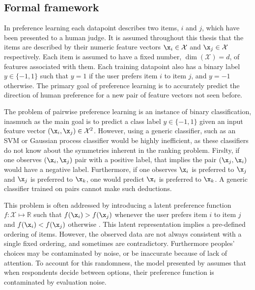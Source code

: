 
\subsection{Formal framework\label{sec:prefKernel}}

In preference learning each datapoint describes two items, $i$ and $j$, which have been presented to a human judge. It is assumed throughout this thesis that the items are described by their numeric feature vectors $\x_i\in\mathcal{X}$ and $\x_j\in\mathcal{X}$ respectively. Each item is assumed to have a fixed number, $\dim(\mathcal{X})=d$, of features associated with them. Each training datapoint also has a binary label $y\in\{-1,1\}$ such that $y=1$ if the user prefers item $i$ to item $j$, and $y=-1$ otherwise. The primary goal of preference learning is to accurately predict the direction of human preference for a new pair of feature vectors not seen before.

The problem of pairwise preference learning is an instance of binary classification, inasmuch as the main goal is to predict a class label $y\in\{-1,1\}$ given an input feature vector $(\x_i,\x_j)\in\mathcal{X}^2$. However, using a generic classifier, such as an SVM or Gaussian process classifier would be highly inefficient, as these classifiers do not know about the symmetries inherent in the ranking problem. Firslty, if one observes $(\x_i,\x_j)$ pair with a positive label, that implies the pair $(\x_j,\x_i)$ would have a negative label. Furthermore, if one observes $\x_i$ is preferred to $\x_j$ and $\x_j$ is preferred to $\x_k$, one would predict $\x_i$ is preferred to $\x_k$. A generic classifier trained on pairs cannot make such deductions.

This problem is often addressed by introducing a latent preference function $f:\mathcal{X}\mapsto \mathbb{R}$ such that
$f(\x_i) > f(\x_j)$ whenever the user prefers item $i$ to item $j$ and $f(\x_i) < f(\x_j)$ otherwise \citep{chu2005}. This latent representation implies a pre-defined ordering of items. However, the observed data are not always consistent with a single fixed ordering, and sometimes are contradictory. Furthermore peoples' choices may be contaminated by noise, or be inaccurate because of lack of attention. To account for this randomness, the model presented by \citep{chu2005} assumes that when respondents decide between options, their preference function is contaminated by evaluation noise.

